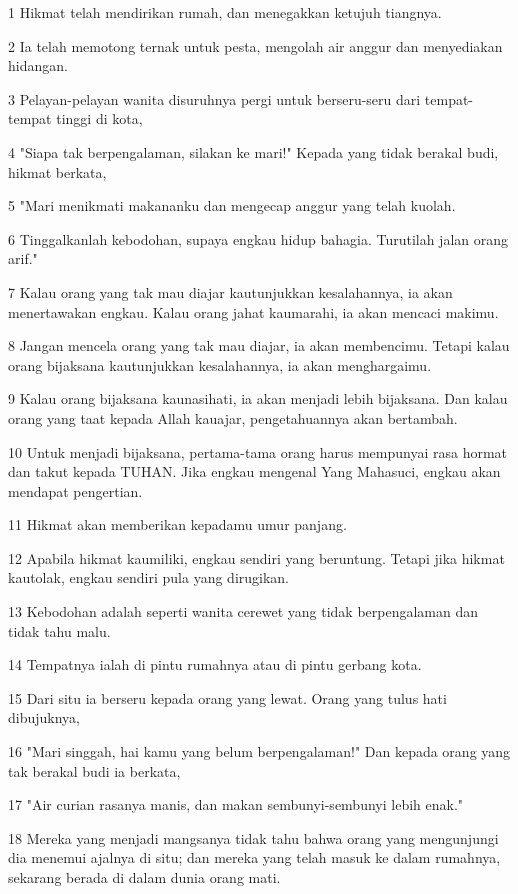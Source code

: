 \par 1 Hikmat telah mendirikan rumah, dan menegakkan ketujuh tiangnya.
\par 2 Ia telah memotong ternak untuk pesta, mengolah air anggur dan menyediakan hidangan.
\par 3 Pelayan-pelayan wanita disuruhnya pergi untuk berseru-seru dari tempat-tempat tinggi di kota,
\par 4 "Siapa tak berpengalaman, silakan ke mari!" Kepada yang tidak berakal budi, hikmat berkata,
\par 5 "Mari menikmati makananku dan mengecap anggur yang telah kuolah.
\par 6 Tinggalkanlah kebodohan, supaya engkau hidup bahagia. Turutilah jalan orang arif."
\par 7 Kalau orang yang tak mau diajar kautunjukkan kesalahannya, ia akan menertawakan engkau. Kalau orang jahat kaumarahi, ia akan mencaci makimu.
\par 8 Jangan mencela orang yang tak mau diajar, ia akan membencimu. Tetapi kalau orang bijaksana kautunjukkan kesalahannya, ia akan menghargaimu.
\par 9 Kalau orang bijaksana kaunasihati, ia akan menjadi lebih bijaksana. Dan kalau orang yang taat kepada Allah kauajar, pengetahuannya akan bertambah.
\par 10 Untuk menjadi bijaksana, pertama-tama orang harus mempunyai rasa hormat dan takut kepada TUHAN. Jika engkau mengenal Yang Mahasuci, engkau akan mendapat pengertian.
\par 11 Hikmat akan memberikan kepadamu umur panjang.
\par 12 Apabila hikmat kaumiliki, engkau sendiri yang beruntung. Tetapi jika hikmat kautolak, engkau sendiri pula yang dirugikan.
\par 13 Kebodohan adalah seperti wanita cerewet yang tidak berpengalaman dan tidak tahu malu.
\par 14 Tempatnya ialah di pintu rumahnya atau di pintu gerbang kota.
\par 15 Dari situ ia berseru kepada orang yang lewat. Orang yang tulus hati dibujuknya,
\par 16 "Mari singgah, hai kamu yang belum berpengalaman!" Dan kepada orang yang tak berakal budi ia berkata,
\par 17 "Air curian rasanya manis, dan makan sembunyi-sembunyi lebih enak."
\par 18 Mereka yang menjadi mangsanya tidak tahu bahwa orang yang mengunjungi dia menemui ajalnya di situ; dan mereka yang telah masuk ke dalam rumahnya, sekarang berada di dalam dunia orang mati.

